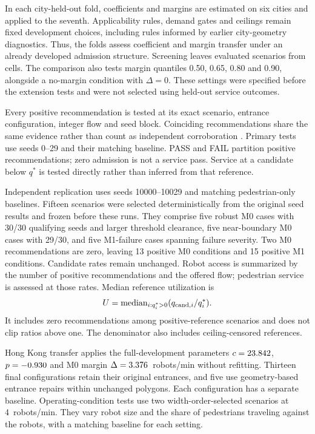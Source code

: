 \documentclass[NewProceedings,letterpaper]{ascelike-new}
\begin{document}
In each city-held-out fold, coefficients and margins are estimated on six cities and applied to the seventh. Applicability rules, demand gates and ceilings remain fixed development choices, including rules informed by earlier city-geometry diagnostics. Thus, the folds assess coefficient and margin transfer under an already developed admission structure. Screening leaves \EvalN{} evaluated scenarios from \EvalCells{} cells. The comparison also tests margin quantiles 0.50, 0.65, 0.80 and 0.90, alongside a no-margin condition with $\Delta=0$. These settings were specified before the extension tests and were not selected using held-out service outcomes.

Every positive recommendation is tested at its exact scenario, entrance configuration, integer flow and seed block. Coinciding recommendations share the same evidence rather than count as independent corroboration \cite{jin2026agreement}. Primary tests use seeds 0--29 and their matching baseline. PASS and FAIL partition positive recommendations; zero admission is not a service pass. Service at a candidate below $q^*$ is tested directly rather than inferred from that reference.

Independent replication uses seeds 10000--10029 and matching pedestrian-only baselines. Fifteen scenarios were selected deterministically from the original seed results and frozen before these runs. They comprise five robust M0 cases with 30/30 qualifying seeds and larger threshold clearance, five near-boundary M0 cases with 29/30, and five M1-failure cases spanning failure severity. Two M0 recommendations are zero, leaving 13 positive M0 conditions and 15 positive M1 conditions. Candidate rates remain unchanged. Robot access is summarized by the number of positive recommendations and the offered flow; pedestrian service is assessed at those rates. Median reference utilization is
\begin{equation}
 U=\operatorname{median}_{i:q_i^*>0}(q_{{\rm cand},i}/q_i^*).
 \label{eq:utilization}
\end{equation}
It includes zero recommendations among \UtilN{} positive-reference scenarios and does not clip ratios above one. The denominator also includes \EvalCensored{} ceiling-censored references.

Hong Kong transfer applies the full-development parameters $c=23.842{}$, $p=-0.930{}$ and M0 margin $\Delta=3.376{}$~robots/min without refitting. Thirteen final configurations retain their original entrances, and five use geometry-based entrance repairs within unchanged polygons. Each configuration has a separate baseline. Operating-condition tests use two width-order-selected scenarios at 4~robots/min. They vary robot size and the share of pedestrians traveling against the robots, with a matching baseline for each setting.
\end{document}

